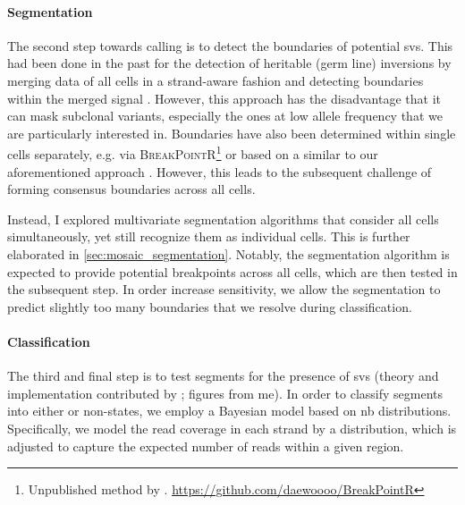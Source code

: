 \paragraph{Segmentation}
The second step towards \sv calling is to detect the boundaries of potential
\acp{sv}. This had been done in the past for the detection of heritable (germ
line) inversions by merging data of all cells in a strand-aware fashion
and detecting boundaries within the merged signal
\citep{Sanders2016}. However, this approach has the disadvantage that it can
mask subclonal variants, especially the ones at low allele frequency that we
are particularly interested in. Boundaries have also been determined within
single cells separately, e.g. via \textsc{BreakPointR}\footnote{Unpublished
    method by \david. \url{https://github.com/daewoooo/BreakPointR}}
or based on a \hmm similar to our aforementioned approach \citep{Bakker2016}.
However, this leads to the subsequent challenge of forming consensus boundaries
across all cells.

Instead, I explored multivariate segmentation algorithms that consider
all cells simultaneously, yet still recognize them as individual cells. This is
further elaborated in \cref{sec:mosaic_segmentation}. Notably, the segmentation
algorithm is expected to provide potential \sv breakpoints across all cells, which are then
tested in the subsequent step. In order increase sensitivity, we allow the
segmentation to predict slightly too many boundaries that we resolve during classification.


\paragraph{Classification} The third and final step is to test segments for the
presence of \acp{sv} (theory and implementation contributed by \maryam; figures
from me). In order to classify segments into either \sv or non-\sv states, we
employ a Bayesian model based on \acl{nb} distributions.
Specifically, we model the read coverage in each strand by a \nb distribution,
which is adjusted to capture the expected number of reads within a given region.

